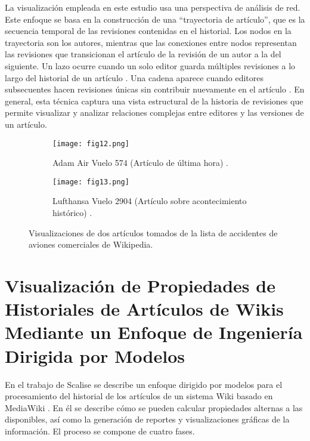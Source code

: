 La visualización empleada en este estudio usa una perspectiva de análisis de red. Este enfoque se basa en la construcción de una “trayectoria de artículo”, que es la secuencia temporal de las revisiones contenidas en el historial. Los nodos en la trayectoria son los autores, mientras que las conexiones entre nodos representan las revisiones que transicionan el artículo de la revisión de un autor a la del siguiente. Un lazo ocurre cuando un solo editor guarda múltiples revisiones a lo largo del historial de un artículo . Una cadena aparece cuando editores subsecuentes hacen revisiones únicas sin contribuir nuevamente en el artículo . En general, esta técnica captura una vista estructural de la historia de revisiones que permite visualizar y analizar relaciones complejas entre editores y las versiones de un artículo.

\begin{figure}[htp]
  \begin{subfigure}[b]{0.45\textwidth}
    \centering
    \texttt{[image: fig12.png]}
    \caption[]{Adam Air Vuelo 574 (Artículo de última hora) \cite[Fig. 2a]{Kee12}.}
    \label{fig:fig12}
  \end{subfigure}
  \hfill
  \begin{subfigure}[b]{0.45\textwidth}
    \centering
    \texttt{[image: fig13.png]}
    \caption[]{Lufthansa Vuelo 2904 (Artículo sobre acontecimiento histórico) \cite[Fig. 2d]{Kee12}.}
    \label{fig:fig13}
  \end{subfigure}
  \caption[Visualizaciones de dos artículos tomados de la lista de accidentes de aviones comerciales de Wikipedia]{Visualizaciones de dos artículos tomados de la lista de accidentes de aviones comerciales de Wikipedia.}
\end{figure}

\section{Visualización de Propiedades de Historiales de Artículos de Wikis Mediante un Enfoque de Ingeniería Dirigida por Modelos}
En el trabajo de Scalise se describe un enfoque dirigido por modelos para el procesamiento del historial de los artículos de un sistema Wiki basado en MediaWiki \cite{Sca08}. En él se describe cómo se pueden calcular propiedades alternas a las disponibles, así como la generación de reportes y visualizaciones gráficas de la información. El proceso se compone de cuatro fases.

